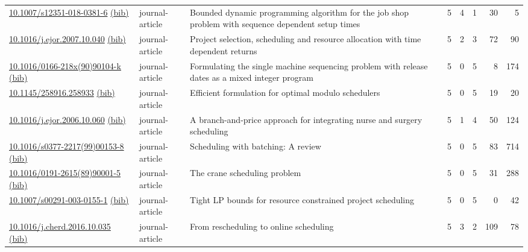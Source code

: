 {\begin{longtable}{p{5cm}lp{11cm}rrrrr}
\href{http://dx.doi.org/10.1007/s12351-018-0381-6}{10.1007/s12351-018-0381-6} \href{https://www.doi2bib.org/bib/10.1007/s12351-018-0381-6}{(bib)} & journal-article & Bounded dynamic programming algorithm for the job shop problem with sequence dependent setup times & 5 & 4 & 1 & 30 & 5 \\
\href{http://dx.doi.org/10.1016/j.ejor.2007.10.040}{10.1016/j.ejor.2007.10.040} \href{https://www.doi2bib.org/bib/10.1016/j.ejor.2007.10.040}{(bib)} & journal-article & Project selection, scheduling and resource allocation with time dependent returns & 5 & 2 & 3 & 72 & 90 \\
\href{http://dx.doi.org/10.1016/0166-218x(90)90104-k}{10.1016/0166-218x(90)90104-k} \href{https://www.doi2bib.org/bib/10.1016/0166-218x(90)90104-k}{(bib)} & journal-article & Formulating the single machine sequencing problem with release dates as a mixed integer program & 5 & 0 & 5 & 8 & 174 \\
\href{http://dx.doi.org/10.1145/258916.258933}{10.1145/258916.258933} \href{https://www.doi2bib.org/bib/10.1145/258916.258933}{(bib)} & journal-article & Efficient formulation for optimal modulo schedulers & 5 & 0 & 5 & 19 & 20 \\
\href{http://dx.doi.org/10.1016/j.ejor.2006.10.060}{10.1016/j.ejor.2006.10.060} \href{https://www.doi2bib.org/bib/10.1016/j.ejor.2006.10.060}{(bib)} & journal-article & A branch-and-price approach for integrating nurse and surgery scheduling & 5 & 1 & 4 & 50 & 124 \\
\href{http://dx.doi.org/10.1016/s0377-2217(99)00153-8}{10.1016/s0377-2217(99)00153-8} \href{https://www.doi2bib.org/bib/10.1016/s0377-2217(99)00153-8}{(bib)} & journal-article & Scheduling with batching: A review & 5 & 0 & 5 & 83 & 714 \\
\href{http://dx.doi.org/10.1016/0191-2615(89)90001-5}{10.1016/0191-2615(89)90001-5} \href{https://www.doi2bib.org/bib/10.1016/0191-2615(89)90001-5}{(bib)} & journal-article & The crane scheduling problem & 5 & 0 & 5 & 31 & 288 \\
\href{http://dx.doi.org/10.1007/s00291-003-0155-1}{10.1007/s00291-003-0155-1} \href{https://www.doi2bib.org/bib/10.1007/s00291-003-0155-1}{(bib)} & journal-article & Tight LP bounds for resource constrained project scheduling & 5 & 0 & 5 & 0 & 42 \\
\href{http://dx.doi.org/10.1016/j.cherd.2016.10.035}{10.1016/j.cherd.2016.10.035} \href{https://www.doi2bib.org/bib/10.1016/j.cherd.2016.10.035}{(bib)} & journal-article & From rescheduling to online scheduling & 5 & 3 & 2 & 109 & 78 \\

\end{longtable}}
